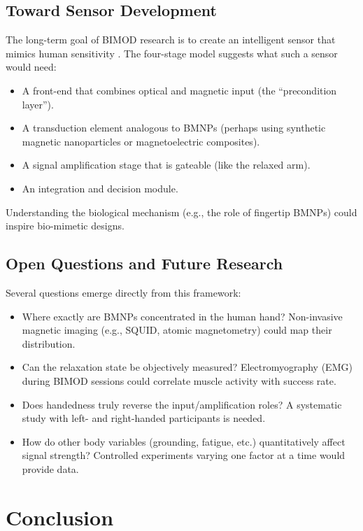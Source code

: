 \documentclass[12pt,a4paper]{article}
\begin{document}
\subsection{Toward Sensor Development}

The long-term goal of BIMOD research is to create an intelligent sensor that mimics human sensitivity \citep{yoon2026bimod}. The four-stage model suggests what such a sensor would need:
\begin{itemize}
    \item A front-end that combines optical and magnetic input (the ``precondition layer'').
    \item A transduction element analogous to BMNPs (perhaps using synthetic magnetic nanoparticles or magnetoelectric composites).
    \item A signal amplification stage that is gateable (like the relaxed arm).
    \item An integration and decision module.
\end{itemize}
Understanding the biological mechanism (e.g., the role of fingertip BMNPs) could inspire bio-mimetic designs.

\subsection{Open Questions and Future Research}

Several questions emerge directly from this framework:
\begin{itemize}
    \item Where exactly are BMNPs concentrated in the human hand? Non-invasive magnetic imaging (e.g., SQUID, atomic magnetometry) could map their distribution.
    \item Can the relaxation state be objectively measured? Electromyography (EMG) during BIMOD sessions could correlate muscle activity with success rate.
    \item Does handedness truly reverse the input/amplification roles? A systematic study with left- and right-handed participants is needed.
    \item How do other body variables (grounding, fatigue, etc.) quantitatively affect signal strength? Controlled experiments varying one factor at a time would provide data.
\end{itemize}

\section{Conclusion}
\end{document}
